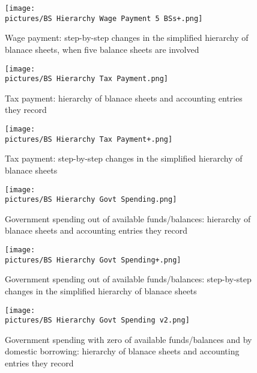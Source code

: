 {\newpage

\begin{figure}
\centering
\texttt{[image: \\pictures/BS Hierarchy Wage Payment 5 BSs+.png]}
\caption{Wage payment: step-by-step changes in the simplified hierarchy of blanace sheets, when five balance sheets are involved}
\label{fig:bs_hierarchy_wage_payment_5BS_}
\end{figure}

\newpage

\begin{figure}
\centering
\texttt{[image: \\pictures/BS Hierarchy Tax Payment.png]}
\caption{Tax payment: hierarchy of blanace sheets and accounting entries they record}
\label{fig:bs_hierarchy_tax_payment}
\end{figure}

\newpage

\begin{figure}
\centering
\texttt{[image: \\pictures/BS Hierarchy Tax Payment+.png]}
\caption{Tax payment: step-by-step changes in the simplified hierarchy of blanace sheets}
\label{fig:bs_hierarchy_tax_payment_}
\end{figure}

\newpage

\begin{figure}
\centering
\texttt{[image: \\pictures/BS Hierarchy Govt Spending.png]}
\caption{Government spending out of available funds/balances: hierarchy of blanace sheets and accounting entries they record}
\label{fig:bs_hierarchy_govt_spending}
\end{figure}

\newpage

\begin{figure}
\centering
\texttt{[image: \\pictures/BS Hierarchy Govt Spending+.png]}
\caption{Government spending out of available funds/balances: step-by-step changes in the simplified hierarchy of blanace sheets}
\label{fig:bs_hierarchy_govt_spending_}
\end{figure}

\newpage

\begin{figure}
\centering
\texttt{[image: \\pictures/BS Hierarchy Govt Spending v2.png]}
\caption{Government spending with zero of available funds/balances and by domestic borrowing: hierarchy of blanace sheets and accounting entries they record}
\label{fig:bs_hierarchy_govt_spending1}
\end{figure}

}
